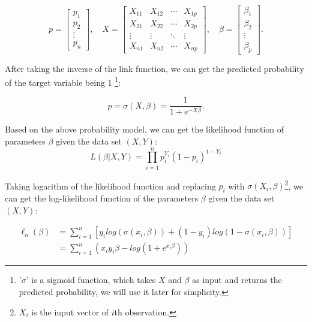 \[
p = \begin{bmatrix} p_1 \\ p_2 \\ \vdots \\ p_n \end{bmatrix}, \quad
X = \begin{bmatrix} X_{11} & X_{12} & \cdots & X_{1p} \\ X_{21} & X_{22} & \cdots & X_{2p} \\ \vdots & \vdots & \ddots & \vdots \\ X_{n1} & X_{n2} & \cdots & X_{np} \end{bmatrix}, \quad
\beta = \begin{bmatrix} \beta_1 \\ \beta_2 \\ \vdots \\ \beta_p \end{bmatrix}.
\]

After taking the inverse of the link function, we can get the predicted probability of the target variable being 1
\footnote{'$\sigma$' is a sigmoid function, which takes \(X\) and \(\beta\) as input and returns the predicted probability,
we will use it later for simplicity.}:

\[
p = \sigma(X, \beta) = \frac{1}{1+e^{-X\beta}}.
\]

Based on the above probability model, we can get the likelihood function 
of parameters \(\beta\) given the data set \((X, Y)\):
\[
L(\beta|X, Y) = \prod_{i=1}^n p_i^{Y_i} (1-p_i)^{1-Y_i} \tag{1-1}
\]


Taking logarithm of the likelihood function and replacing \(p_i\) with 
\(\sigma(X_i, \beta)\)\footnote{$X_i$ is the input vector of \(i\)th observation.}, 
we can get the log-likelihood function of the parameters \(\beta\) given the data set \((X, Y)\):

\begin{align*}
    \ell_n(\beta) 
    & = \sum_{i=1}^n [y_i log(\sigma(x_i, \beta)) + (1-y_i) log(1-\sigma(x_i, \beta))] \\
    & = \sum_{i=1}^n (x_iy_i \beta - log(1+e^{x_i\beta}))
\end{align*}


